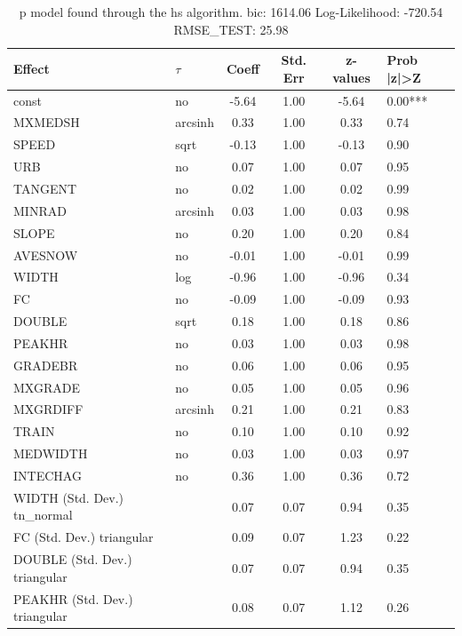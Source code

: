 \begin{table}
	\caption{p model found through the hs algorithm. bic: 1614.06 Log-Likelihood: -720.54 RMSE_TEST: 25.98}
	\begin{center}
		\begin{tabular}{|l|l|c|c|c|l|}
			\hline
			Effect & $\tau$ & Coeff & Std. Err & z-values & Prob |z|>Z \\
			\hline
			const & no & -5.64 & 1.00 & -5.64 & 0.00*** \\
			\hline
			MXMEDSH & arcsinh & 0.33 & 1.00 & 0.33 & 0.74 \\
			\hline
			SPEED & sqrt & -0.13 & 1.00 & -0.13 & 0.90 \\
			\hline
			URB & no & 0.07 & 1.00 & 0.07 & 0.95 \\
			\hline
			TANGENT & no & 0.02 & 1.00 & 0.02 & 0.99 \\
			\hline
			MINRAD & arcsinh & 0.03 & 1.00 & 0.03 & 0.98 \\
			\hline
			SLOPE & no & 0.20 & 1.00 & 0.20 & 0.84 \\
			\hline
			AVESNOW & no & -0.01 & 1.00 & -0.01 & 0.99 \\
			\hline
			WIDTH & log & -0.96 & 1.00 & -0.96 & 0.34 \\
			\hline
			FC & no & -0.09 & 1.00 & -0.09 & 0.93 \\
			\hline
			DOUBLE & sqrt & 0.18 & 1.00 & 0.18 & 0.86 \\
			\hline
			PEAKHR & no & 0.03 & 1.00 & 0.03 & 0.98 \\
			\hline
			GRADEBR & no & 0.06 & 1.00 & 0.06 & 0.95 \\
			\hline
			MXGRADE & no & 0.05 & 1.00 & 0.05 & 0.96 \\
			\hline
			MXGRDIFF & arcsinh & 0.21 & 1.00 & 0.21 & 0.83 \\
			\hline
			TRAIN & no & 0.10 & 1.00 & 0.10 & 0.92 \\
			\hline
			MEDWIDTH & no & 0.03 & 1.00 & 0.03 & 0.97 \\
			\hline
			INTECHAG & no & 0.36 & 1.00 & 0.36 & 0.72 \\
			\hline
			WIDTH (Std. Dev.) tn_normal &  & 0.07 & 0.07 & 0.94 & 0.35 \\
			\hline
			FC (Std. Dev.) triangular &  & 0.09 & 0.07 & 1.23 & 0.22 \\
			\hline
			DOUBLE (Std. Dev.) triangular &  & 0.07 & 0.07 & 0.94 & 0.35 \\
			\hline
			PEAKHR (Std. Dev.) triangular &  & 0.08 & 0.07 & 1.12 & 0.26 \\

\end{tabular}
\end{center}
\end{table}
